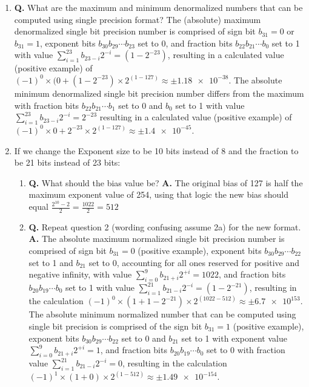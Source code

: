\documentclass[main.tex]{subfiles}
\begin{document}
\begin{enumerate}
\begin{enumerate}
    \item \textbf{Q.} What are the maximum and minimum denormalized numbers that can be computed using single precision format?  The (absolute) maximum denormalized single bit precision number is comprised of sign bit $b_{31} = 0$ or $b_{31} = 1$, exponent bits $b_{30} b_{29} \cdots b_{23}$ set to 0, and fraction bits $b_{22} b_{21} \cdots b_{0}$ set to 1 with value $\sum_{i=1}^{23} b_{23-i} 2^{-i} = (1-2^{-23})$, resulting in a calculated value (positive example) of $(-1)^0 \times (0+(1-2^{-23}) \times 2^{(1-127)} \approx \pm\num{1.18e-38}$. The absolute minimum denormalized single bit precision number differs from the maximum with fraction bits $b_{22} b_{21} \cdots b_{1}$ set to 0 and $b_{0}$ set to 1 with value $\sum_{i=1}^{23} b_{23-i} 2^{-i} = 2^{-23}$ resulting in a calculated value (positive example) of $(-1)^0 \times 0+2^{-23} \times 2^{(1-127)} \approx \pm\num{1.4e-45}$.
    
    \item {} If we change the Exponent size to be 10 bits instead of 8 and the fraction to be 21 bits instead of 23 bits:
    
    \begin{enumerate}
        \item \textbf{Q.} What should the bias value be? \textbf{A.} The original bias of 127 is half the maximum exponent value of 254, using that logic the new bias should equal $\frac{2^{10} - 2}{2} = \frac{1022}{2}=512$
        
        \item \textbf{Q.} Repeat question 2 (wording confusing assume 2a) for the new format. \textbf{A.} The absolute maximum normalized single bit precision number is comprised of sign bit $b_{31} = 0$ (positive example), exponent bits $b_{30} b_{29} \cdots b_{22}$ set to 1 and $b_{21}$ set to 0, accounting for all ones reserved for positive and negative infinity, with value $\sum_{i=0}^{9} b_{21+i} 2^{+i} = 1022$, and fraction bits $b_{20} b_{19} \cdots b_{0}$ set to 1 with value $\sum_{i=1}^{21} b_{21-i} 2^{-i} = (1-2^{-21})$, resulting in the calculation $(-1)^0 \times (1+1-2^{-21}) \times 2^{(1022-512)} \approx \pm \num{6.7e153}$. The absolute minimum normalized number that can be computed using single bit precision is comprised of the sign bit $b_{31} = 1$ (positive example), exponent bits $b_{30} b_{29} \cdots b_{22}$ set to 0 and $b_{21}$ set to 1 with exponent value $\sum_{i=0}^{9} b_{21+i} 2^{+i} = 1$, and fraction bits $b_{20} b_{19} \cdots b_{0}$ set to 0 with fraction value $\sum_{i=1}^{21} b_{21-i} 2^{-i} = 0$, resulting in the calculation  $(-1)^1 \times (1+0) \times 2^{(1-512)} \approx \pm \num{1.49e-154}$.
        

\end{enumerate}
\end{enumerate}
\end{enumerate}
\end{document}

